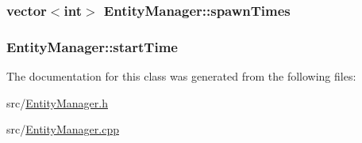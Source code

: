 \hypertarget{class_entity_manager_a082583e28a3548b6a1660f8ad12e57c2}{
\subsubsection[{spawn\-Times}]{\setlength{\rightskip}{0pt plus 5cm}vector$<${\bf int}$>$ Entity\-Manager\-::spawn\-Times}}\label{class_entity_manager_a082583e28a3548b6a1660f8ad12e57c2}
\hypertarget{class_entity_manager_a5925567da54e6bfc6718cbcdd4bb058e}{
\subsubsection[{start\-Time}]{ Entity\-Manager\-::start\-Time}}\label{class_entity_manager_a5925567da54e6bfc6718cbcdd4bb058e}


The documentation for this class was generated from the following files\-:\begin{DoxyCompactItemize}
\item 
src/\hyperlink{_entity_manager_8h}{Entity\-Manager.\-h}\item 
src/\hyperlink{_entity_manager_8cpp}{Entity\-Manager.\-cpp}\end{DoxyCompactItemize}
